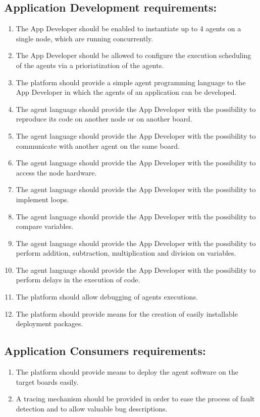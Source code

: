 \documentclass{scrreprt}
\begin{document}
\subsection{Application Development requirements:}
\renewcommand{\labelenumi}{R_AD_\arabic{enumi}}
\begin{enumerate}
\item The App Developer should be enabled to instantiate up to 4 agents on a single node, which are running concurrently.
\item The App Developer should be allowed to configure the execution scheduling of the agents via a prioriatization of the agents.
\item The platform should provide a simple agent programming language to the App Developer in which the agents of an application can be developed.
\item The agent language should provide the App Developer with the possibility to reproduce its code on another node or on another board.
\item The agent language should provide the App Developer with the possibility to communicate with another agent on the same board.
\item The agent language should provide the App Developer with the possibility to access the node hardware.
\item The agent language should provide the App Developer with the possibility to implement loops. 
\item The agent language should provide the App Developer with the possibility to compare variables.
\item The agent language should provide the App Developer with the possibility to perform addition, subtraction, multiplication and division on variables.
\item The agent language should provide the App Developer with the possibility to perform delays in the execution of code.
\item The platform should allow debugging of agents executions.
\item The platform should provide means for the creation of easily installable deployment packages.
\end{enumerate}


\subsection{Application Consumers requirements:}
\renewcommand{\labelenumi}{R_AC_\arabic{enumi}}
\begin{enumerate}
\item The platform should provide means to deploy the agent software on the target boards easily.
\item A tracing mechanism should be provided in order to ease the process of fault detection and to allow valuable bug descriptions.
\end{enumerate}
\end{document}
